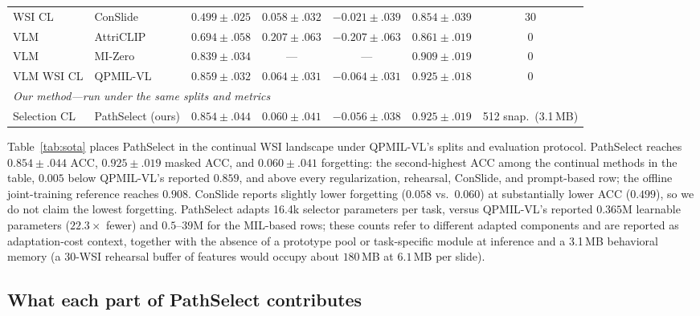 \documentclass{article}
\begin{document}
\begin{table}[t]
\begin{tabular}{llccccc}
WSI CL & ConSlide \cite{huang2023conslide} & $0.499{\pm}.025$ & $0.058{\pm}.032$ & $-0.021{\pm}.039$ & $0.854{\pm}.039$ & 30 \\
VLM & AttriCLIP \cite{wang2023attriclip} & $0.694{\pm}.058$ & $0.207{\pm}.063$ & $-0.207{\pm}.063$ & $0.861{\pm}.019$ & 0 \\
VLM & MI-Zero \cite{lu2023mizero} & $0.839{\pm}.034$ & --- & --- & $0.909{\pm}.019$ & 0 \\
VLM WSI CL & QPMIL-VL \cite{gou2025qpmil} & $0.859{\pm}.032$ & $0.064{\pm}.031$ & $-0.064{\pm}.031$ & $0.925{\pm}.018$ & 0 \\
\midrule
\multicolumn{7}{l}{\emph{Our method---run under the same splits and metrics}} \\
Selection CL & PathSelect (ours) & $0.854{\pm}.044$ & $0.060{\pm}.041$ & $-0.056{\pm}.038$ & $0.925{\pm}.019$ & 512 snap.\ (3.1\,MB) \\
\bottomrule
\end{tabular}
\end{table}

Table~\ref{tab:sota} places PathSelect in the continual WSI landscape under QPMIL-VL's splits and evaluation protocol. PathSelect reaches $0.854{\pm}.044$ ACC, $0.925{\pm}.019$ masked ACC, and $0.060{\pm}.041$ forgetting: the second-highest ACC among the continual methods in the table, $0.005$ below QPMIL-VL's reported $0.859$, and above every regularization, rehearsal, ConSlide, and prompt-based row; the offline joint-training reference reaches $0.908$. ConSlide reports slightly lower forgetting ($0.058$ vs.\ $0.060$) at substantially lower ACC ($0.499$), so we do not claim the lowest forgetting. PathSelect adapts 16.4k selector parameters per task, versus QPMIL-VL's reported $0.365$M learnable parameters ($22.3\times$ fewer) and $0.5$--$39$M for the MIL-based rows; these counts refer to different adapted components and are reported as adaptation-cost context, together with the absence of a prototype pool or task-specific module at inference and a 3.1\,MB behavioral memory (a 30-WSI rehearsal buffer of features would occupy about $180$\,MB at $6.1$\,MB per slide).

\subsection{What each part of PathSelect contributes}
\label{ssec:ablation}
\end{document}

